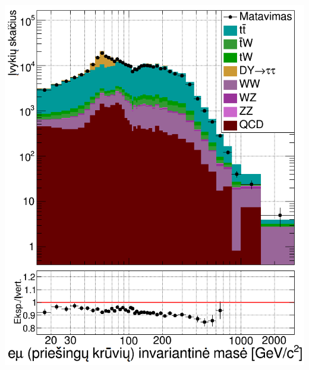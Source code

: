 \documentclass[xcolor=dvipsnames]{beamer}
\begin{document}
\begin{frame}
\begin{minipage}{0.46\textwidth}
		\includegraphics[width=0.9\linewidth]{emuWQCD_SMALL.png}
	\end{minipage}
\end{frame}
\end{document}
